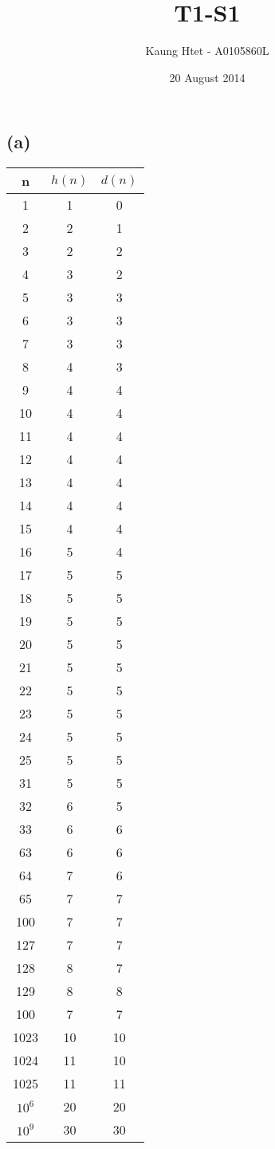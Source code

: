\documentclass[a4paper,11pt,twoside,twocolumn]{article}
\title{
  \normalfont \normalsize
  \horrule{0.5pt}
  \huge T1-S1
  \horrule{2pt}
}
\author{Kaung Htet - A0105860L}
\date{20 August 2014}
\begin{document}
\subsection{(a)}

\begin{center}
  \begin{tabular}{|c|c|c|}
    \hline
    n & $h(n)$ & $d(n)$ \\ \hline
    1 & 1 & 0 \\
    2 & 2 & 1 \\
    3 & 2 & 2 \\
    4 & 3 & 2 \\
    5 & 3 & 3 \\
    6 & 3 & 3 \\
    7 & 3 & 3 \\
    8 & 4 & 3 \\
    9 & 4 & 4 \\
    10 & 4 & 4 \\
    11 & 4 & 4 \\
    12 & 4 & 4 \\
    13 & 4 & 4 \\
    14 & 4 & 4 \\
    15 & 4 & 4 \\
    16 & 5 & 4 \\
    17 & 5 & 5 \\
    18 & 5 & 5 \\
    19 & 5 & 5 \\
    20 & 5 & 5 \\
    21 & 5 & 5 \\
    22 & 5 & 5 \\
    23 & 5 & 5 \\
    24 & 5 & 5 \\
    25 & 5 & 5 \\
    31 & 5 & 5 \\
    32 & 6 & 5 \\
    33 & 6 & 6 \\
    63 & 6 & 6 \\
    64 & 7 & 6 \\
    65 & 7 & 7 \\
    100 & 7 & 7 \\
    127 & 7 & 7 \\
    128 & 8 & 7 \\
    129 & 8 & 8 \\
    100 & 7 & 7 \\
    1023 & 10 & 10 \\
    1024 & 11 & 10 \\
    1025 & 11 & 11 \\
    $10^6$ & 20 & 20 \\
    $10^9$ & 30 & 30 \\ \hline

  \end{tabular}
\end{center}
\end{document}
